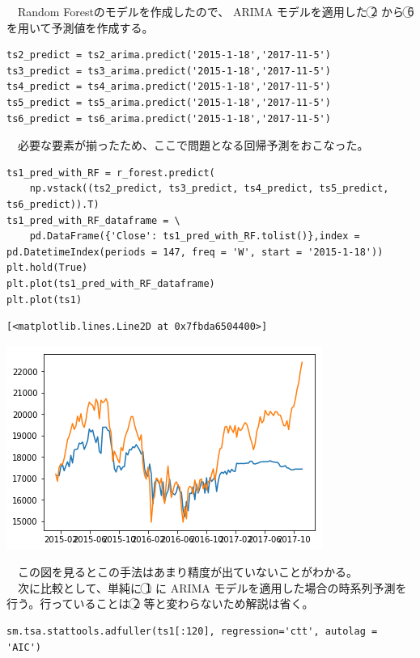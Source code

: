 \documentclass{scrartcl}
\begin{document}
　Random Forestのモデルを作成したので、 ARIMA モデルを適用した \textcircled{\scriptsize 2} から \textcircled{\scriptsize 6} を用いて予測値を作成する。\\
\begin{verbatim}
ts2_predict = ts2_arima.predict('2015-1-18','2017-11-5')
ts3_predict = ts3_arima.predict('2015-1-18','2017-11-5')
ts4_predict = ts4_arima.predict('2015-1-18','2017-11-5')
ts5_predict = ts5_arima.predict('2015-1-18','2017-11-5')
ts6_predict = ts6_arima.predict('2015-1-18','2017-11-5')
\end{verbatim}

　必要な要素が揃ったため、ここで問題となる回帰予測をおこなった。\\
\begin{verbatim}
ts1_pred_with_RF = r_forest.predict(
    np.vstack((ts2_predict, ts3_predict, ts4_predict, ts5_predict, ts6_predict)).T)
ts1_pred_with_RF_dataframe = \
    pd.DataFrame({'Close': ts1_pred_with_RF.tolist()},index =  pd.DatetimeIndex(periods = 147, freq = 'W', start = '2015-1-18'))
plt.hold(True)
plt.plot(ts1_pred_with_RF_dataframe)
plt.plot(ts1)
\end{verbatim}

\begin{verbatim}
[<matplotlib.lines.Line2D at 0x7fbda6504400>]
\end{verbatim}
\begin{center}
\includegraphics[width=.9\linewidth]{./obipy-resources/MOXXjm.png}
\end{center}

　この図を見るとこの手法はあまり精度が出ていないことがわかる。\\
　次に比較として、単純に \textcircled{\scriptsize 1} に ARIMA モデルを適用した場合の時系列予測を行う。行っていることは \textcircled{\scriptsize 2} 等と変わらないため解説は省く。\\
\begin{verbatim}
sm.tsa.stattools.adfuller(ts1[:120], regression='ctt', autolag = 'AIC')
\end{verbatim}
\end{document}
